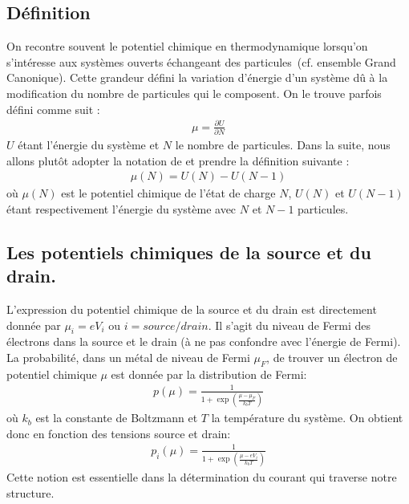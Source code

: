 \subsection{Définition}

On recontre souvent le potentiel chimique en thermodynamique lorsqu'on s'intéresse aux systèmes ouverts échangeant des particules~(cf. ensemble Grand Canonique). Cette grandeur défini la variation d'énergie d'un système d\^u à la modification du nombre de particules qui le composent. On le trouve parfois défini comme suit :
\begin{eqnarray}
\mu = \frac{\partial U}{\partial N} \nonumber
\end{eqnarray}
$U$ étant l'énergie du système et $N$ le nombre de particules. Dans la suite, nous allons plut\^ot adopter la notation de \cite{Hanson2007} et prendre la définition suivante :
\begin{eqnarray}
\mu(N) = U(N) - U(N-1)
\label{potchimeq}
\end{eqnarray}
où $\mu(N)$ est le potentiel chimique de l'état de charge $N$, $U(N)$ et $U(N-1)$ étant respectivement l'énergie du système avec $N$ et $N-1$ particules.


\subsection{Les potentiels chimiques de la source et du drain.}
L'expression du potentiel chimique de la source et du drain est directement donnée par $\mu_i = e V_i$ ou $i=source/drain$. Il s'agit du niveau de Fermi des électrons dans la source et le drain (à ne pas confondre avec l'énergie de Fermi). La probabilité, dans un métal de niveau de Fermi $\mu_F$, de trouver un électron de potentiel chimique $\mu$ est donnée par la distribution de Fermi:
\begin{eqnarray}
p(\mu) = \frac{1}{1 + \exp{(\frac{\mu - \mu_F}{k_bT})}} \nonumber
\end{eqnarray}
où $k_b$ est la constante de Boltzmann et $T$ la température du système. On obtient donc en fonction des tensions source et drain:
\begin{eqnarray}
p_i(\mu) = \frac{1}{1 + \exp{(\frac{\mu - eV_i}{k_bT})}}
\end{eqnarray}
Cette notion est essentielle dans la détermination du courant qui traverse notre structure.

